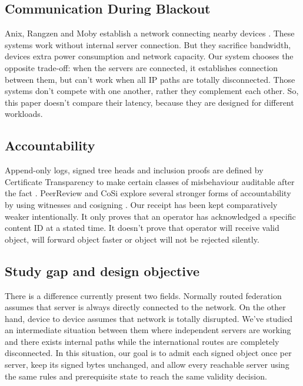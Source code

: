 \documentclass[conference,a4paper]{IEEEtran}
\begin{document}
\subsection{Communication During Blackout}

Anix, Rangzen and Moby establish a network connecting nearby devices \cite{kamali2025anix,lerner2016rangzen,pradeep2022moby}. These systems work without internal server connection. But they sacrifice bandwidth, devices extra power consumption and network capacity. Our system chooses the opposite trade-off: when the servers are connected, it establishes connection between them, but can’t work when all IP paths are totally disconnected. Those systems don’t compete with one another, rather they complement each other. So, this paper doesn’t compare their latency, because they are designed for different workloads.

\subsection{Accountability}

Append-only logs, signed tree heads and inclusion proofs are defined by Certificate Transparency to make certain classes of misbehaviour auditable after the fact \cite{rfc9162}.  PeerReview and CoSi explore several stronger forms of accountability by using witnesses and cosigning \cite{haeberlen2007peerreview,syta2016cosi}. Our receipt has been kept comparatively weaker intentionally. It only proves that an operator has acknowledged a specific content ID at a stated time. It doesn’t prove that operator will receive valid object, will forward object faster or object will not be rejected silently.

\subsection{Study gap and design objective}

There is a difference currently present two fields. Normally routed federation assumes that server is always directly connected to the network. On the other hand, device to device assumes that network is totally disrupted. We’ve studied an intermediate situation between them where independent servers are working and there exists internal paths while the international routes are completely disconnected. In this situation, our goal is to admit each signed object once per server, keep its signed bytes unchanged, and allow every reachable server using the same rules and prerequisite state to reach the same validity decision.
\end{document}
